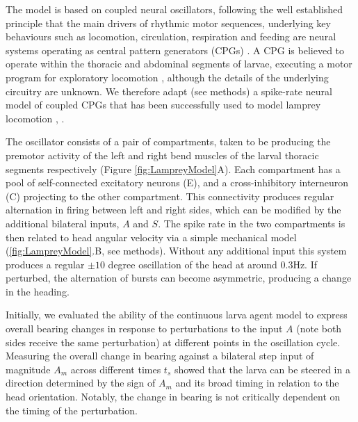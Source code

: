 \documentclass[10pt,a4paper]{article}
\begin{document}
The model is based on coupled neural oscillators, following the well established principle that the main drivers of rhythmic  motor sequences, underlying key behaviours such as locomotion, circulation, respiration and feeding are neural systems operating as central pattern generators (CPGs) \citep{delcomyn1980neural}. A CPG is believed to operate  within the thoracic and abdominal segments of larvae, executing a motor program for exploratory locomotion \citep{berni2012autonomous,lemon2015whole}, although the details of the underlying circuitry are unknown. We therefore adapt (see methods) a spike-rate neural model of coupled CPGs that has been successfully used to model lamprey locomotion \citep{cohen1992modelling,lansner1997realistic}, \cite[see][]{marder1996principles}.


The oscillator consists of a pair of compartments, taken to be producing the premotor activity of the left and right bend muscles of the larval thoracic  segments respectively (Figure \ref{fig:LampreyModel}A). Each compartment has a pool of self-connected excitatory neurons (E), and a cross-inhibitory interneuron (C) projecting to the other compartment. This connectivity produces regular alternation in firing between left and right sides, which can be modified by the additional bilateral inputs, $A$ and $S$. The spike rate in the two compartments is then related to head angular velocity via a simple mechanical model (\ref{fig:LampreyModel}.B, see methods). Without any additional input this system produces a regular $\pm 10$ degree oscillation of the head at around 0.3Hz. If perturbed, the alternation of bursts can become asymmetric, producing a change in the heading. 

Initially, we evaluated the ability of the continuous larva agent model to express overall bearing changes in response to perturbations to the input $A$ (note both sides receive the same perturbation) at different points in the oscillation cycle. Measuring the overall change in bearing against a bilateral step input of magnitude $A_m$ across different times $t_s$ showed that the larva can be steered in a direction determined by the sign of $A_m$ and its broad timing in relation to the head orientation.
Notably, the change in bearing is not critically dependent on the timing of the perturbation. 

\end{document}
